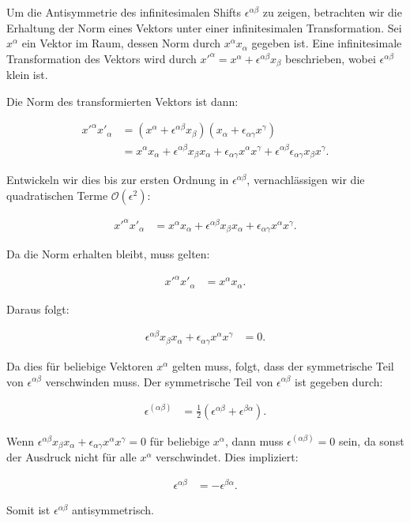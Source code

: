 Um die Antisymmetrie des infinitesimalen Shifts $\epsilon^{\alpha \beta}$ zu zeigen, betrachten wir die Erhaltung der Norm eines Vektors unter einer infinitesimalen Transformation. Sei $x^\alpha$ ein Vektor im Raum, dessen Norm durch $x^\alpha x_\alpha$ gegeben ist. Eine infinitesimale Transformation des Vektors wird durch $x'^\alpha = x^\alpha + \epsilon^{\alpha \beta} x_\beta$ beschrieben, wobei $\epsilon^{\alpha \beta}$ klein ist.

Die Norm des transformierten Vektors ist dann:

\begin{align*}
x'^\alpha x'_\alpha &= (x^\alpha + \epsilon^{\alpha \beta} x_\beta)(x_\alpha + \epsilon_{\alpha \gamma} x^\gamma) \\
&= x^\alpha x_\alpha + \epsilon^{\alpha \beta} x_\beta x_\alpha + \epsilon_{\alpha \gamma} x^\alpha x^\gamma + \epsilon^{\alpha \beta} \epsilon_{\alpha \gamma} x_\beta x^\gamma.
\end{align*}

Entwickeln wir dies bis zur ersten Ordnung in $\epsilon^{\alpha \beta}$, vernachlässigen wir die quadratischen Terme $\mathcal{O}(\epsilon^2)$:

\begin{align*}
x'^\alpha x'_\alpha &= x^\alpha x_\alpha + \epsilon^{\alpha \beta} x_\beta x_\alpha + \epsilon_{\alpha \gamma} x^\alpha x^\gamma.
\end{align*}

Da die Norm erhalten bleibt, muss gelten:

\begin{align*}
x'^\alpha x'_\alpha &= x^\alpha x_\alpha.
\end{align*}

Daraus folgt:

\begin{align*}
\epsilon^{\alpha \beta} x_\beta x_\alpha + \epsilon_{\alpha \gamma} x^\alpha x^\gamma &= 0.
\end{align*}

Da dies für beliebige Vektoren $x^\alpha$ gelten muss, folgt, dass der symmetrische Teil von $\epsilon^{\alpha \beta}$ verschwinden muss. Der symmetrische Teil von $\epsilon^{\alpha \beta}$ ist gegeben durch:

\begin{align*}
\epsilon^{(\alpha \beta)} &= \frac{1}{2} (\epsilon^{\alpha \beta} + \epsilon^{\beta \alpha}).
\end{align*}

Wenn $\epsilon^{\alpha \beta} x_\beta x_\alpha + \epsilon_{\alpha \gamma} x^\alpha x^\gamma = 0$ für beliebige $x^\alpha$, dann muss $\epsilon^{(\alpha \beta)} = 0$ sein, da sonst der Ausdruck nicht für alle $x^\alpha$ verschwindet. Dies impliziert:

\begin{align*}
\epsilon^{\alpha \beta} &= -\epsilon^{\beta \alpha}.
\end{align*}

Somit ist $\epsilon^{\alpha \beta}$ antisymmetrisch.

